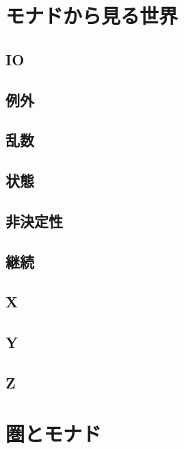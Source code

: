 \documentclass[twocolumn]{jsbook}
\begin{document}
\part{モナドから見る世界}

\chapter{IO}

\chapter{例外}

\chapter{乱数}

\chapter{状態}

\chapter{非決定性}

\chapter{継続}

\chapter{X}

\chapter{Y}

\chapter{Z}


\part{圏とモナド}
\end{document}
